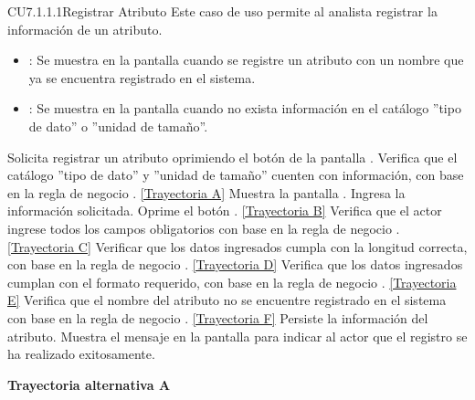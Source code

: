 \begin{UseCase}{CU7.1.1.1}{Registrar Atributo}{
		Este caso de uso permite al analista registrar la información de un atributo.
	}
{\begin{itemize}
		\item {}: Se muestra en la pantalla  cuando se registre un atributo con un nombre que ya se encuentra registrado en el sistema.
		\item {}: Se muestra en la pantalla  cuando no exista información en el catálogo ''tipo de dato'' o ''unidad de tamaño''.
		\end{itemize}
		}
	\end{UseCase}
	\begin{UCtrayectoria}
		\UCpaso[\UCactor] Solicita registrar un atributo oprimiendo el botón  de la pantalla .
		\UCpaso[\UCsist] Verifica que el catálogo ''tipo de dato'' y ''unidad de tamaño'' cuenten con información, con base en la regla de negocio . \hyperlink{CU7-1-1-1:TAA}{[Trayectoria A]}
		\UCpaso[\UCsist] Muestra la pantalla .
		\UCpaso[\UCactor] Ingresa la información solicitada. \label{CU7.1.1-P3}
		\UCpaso[\UCactor] Oprime el botón . \hyperlink{CU7-1-1-1:TAB}{[Trayectoria B]}
		\UCpaso[\UCsist] Verifica que el actor ingrese todos los campos obligatorios con base en la regla de negocio . \hyperlink{CU7-1-1-1:TAC}{[Trayectoria C]}
		\UCpaso[\UCsist] Verificar que los datos ingresados cumpla con la longitud correcta, con base en la regla de negocio . \hyperlink{CU7-1-1-1:TAD}{[Trayectoria D]}
		\UCpaso[\UCsist] Verifica que los datos ingresados cumplan con el formato requerido, con base en la regla de negocio . \hyperlink{CU7-1-1-1:TAE}{[Trayectoria E]}
		\UCpaso[\UCsist] Verifica que el nombre del atributo no se encuentre registrado en el sistema con base en la regla de negocio . \hyperlink{CU7-1-1-1:TAF}{[Trayectoria F]}
		\UCpaso[\UCsist] Persiste la información del atributo.
		\UCpaso[\UCsist] Muestra el mensaje  en la pantalla  para indicar al actor que el registro se ha realizado exitosamente.
	\end{UCtrayectoria}		
\hypertarget{CU7-1-1-1:TAA}{\textbf{Trayectoria alternativa A}}\\
